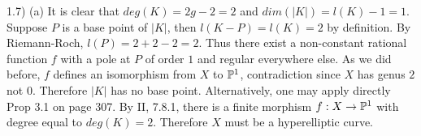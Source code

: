 1.7) (a) It is clear that $deg(K)=2g-2=2$ and
$dim(|K|)=l(K)-1=1$. Suppose $P$ is a base point of $|K|$, then
$l(K-P)=l(K)=2$ by definition. By Riemann-Roch, $l(P)=2+2-2=2$. Thus
there exist a non-constant rational function $f$ with a pole at $P$ of
order $1$ and regular everywhere else. As we did before, $f$ defines
an isomorphism from $X$ to ${\Bbb P}^1$, contradiction since $X$ has
genus $2$ not $0$. Therefore $|K|$ has no base point.  Alternatively,
one may apply directly Prop 3.1 on page 307.  By II, 7.8.1, there is a
finite morphism $f: X\rightarrow {\Bbb P}^1$ with degree equal to
$deg(K)=2$. Therefore $X$ must be a hyperelliptic curve.





















































